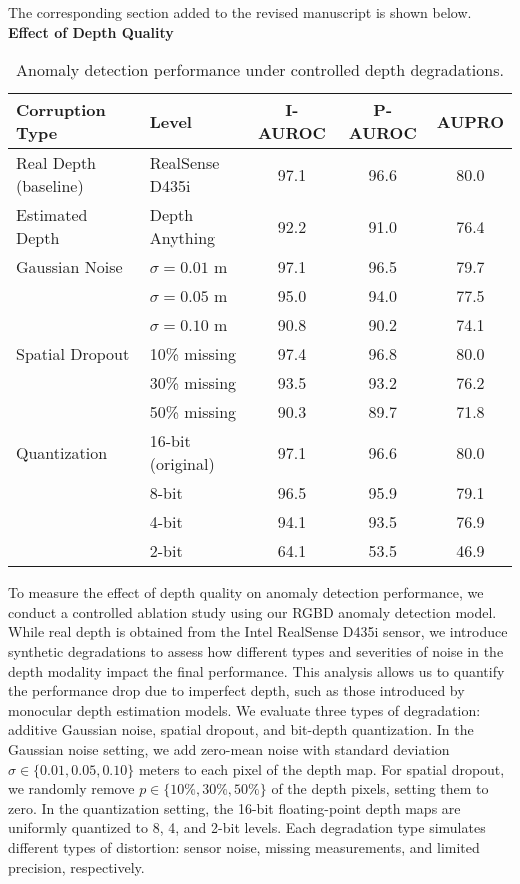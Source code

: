 \documentclass[a4paper,fleqnn]{cas-sc}
\begin{document}
The corresponding section added to the revised manuscript is shown below. \\


\textbf{Effect of Depth Quality}

\renewcommand{\thetable}{10}

\begin{table}[h]
\centering
\caption{Anomaly detection performance under controlled depth degradations.}
\label{tab:degradation}
\begin{tabular}{l|l|c|c|c}
\hline
\textbf{Corruption Type} & \textbf{Level} & \textbf{I-AUROC} & \textbf{P-AUROC} & \textbf{AUPRO} \\
\hline
Real Depth (baseline) & RealSense D435i & 97.1 & 96.6 & 80.0 \\
Estimated Depth & Depth Anything & 92.2 & 91.0 & 76.4 \\
\hline
Gaussian Noise & $\sigma = 0.01$ m & 97.1 & 96.5 & 79.7 \\
& $\sigma = 0.05$ m & 95.0 & 94.0 & 77.5 \\
& $\sigma = 0.10$ m & 90.8 & 90.2 & 74.1 \\
\hline
Spatial Dropout & 10\% missing & 97.4 & 96.8 & 80.0 \\
& 30\% missing & 93.5 & 93.2 & 76.2 \\
& 50\% missing & 90.3 & 89.7 & 71.8 \\
\hline
Quantization & 16-bit (original) & 97.1 & 96.6 & 80.0 \\
& 8-bit & 96.5 & 95.9 & 79.1 \\
& 4-bit & 94.1 & 93.5 & 76.9 \\
& 2-bit & 64.1 & 53.5 & 46.9 \\
\hline
\end{tabular}
\end{table}

To measure the effect of depth quality on anomaly detection performance, we conduct a controlled ablation study using our RGBD anomaly detection model. While real depth is obtained from the Intel RealSense D435i sensor, we introduce synthetic degradations to assess how different types and severities of noise in the depth modality impact the final performance. This analysis allows us to quantify the performance drop due to imperfect depth, such as those introduced by monocular depth estimation models. We evaluate three types of degradation: additive Gaussian noise, spatial dropout, and bit-depth quantization. In the Gaussian noise setting, we add zero-mean noise with standard deviation $\sigma \in \{0.01, 0.05, 0.10\}$ meters to each pixel of the depth map. For spatial dropout, we randomly remove $p \in \{10\%, 30\%, 50\%\}$ of the depth pixels, setting them to zero. In the quantization setting, the 16-bit floating-point depth maps are uniformly quantized to 8, 4, and 2-bit levels. Each degradation type simulates different types of distortion: sensor noise, missing measurements, and limited precision, respectively.
\end{document}
